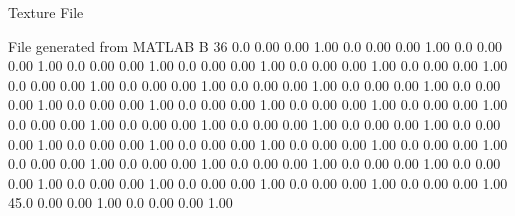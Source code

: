 Texture File
 
File generated from MATLAB
B 36
   0.0   0.00   0.00  1.00
   0.0   0.00   0.00  1.00
   0.0   0.00   0.00  1.00
   0.0   0.00   0.00  1.00
   0.0   0.00   0.00  1.00
   0.0   0.00   0.00  1.00
   0.0   0.00   0.00  1.00
   0.0   0.00   0.00  1.00
   0.0   0.00   0.00  1.00
   0.0   0.00   0.00  1.00
   0.0   0.00   0.00  1.00
   0.0   0.00   0.00  1.00
   0.0   0.00   0.00  1.00
   0.0   0.00   0.00  1.00
   0.0   0.00   0.00  1.00
   0.0   0.00   0.00  1.00
   0.0   0.00   0.00  1.00
   0.0   0.00   0.00  1.00
   0.0   0.00   0.00  1.00
   0.0   0.00   0.00  1.00
   0.0   0.00   0.00  1.00
   0.0   0.00   0.00  1.00
   0.0   0.00   0.00  1.00
   0.0   0.00   0.00  1.00
   0.0   0.00   0.00  1.00
   0.0   0.00   0.00  1.00
   0.0   0.00   0.00  1.00
   0.0   0.00   0.00  1.00
   0.0   0.00   0.00  1.00
   0.0   0.00   0.00  1.00
   0.0   0.00   0.00  1.00
   0.0   0.00   0.00  1.00
   0.0   0.00   0.00  1.00
   0.0   0.00   0.00  1.00
  45.0   0.00   0.00  1.00
   0.0   0.00   0.00  1.00
